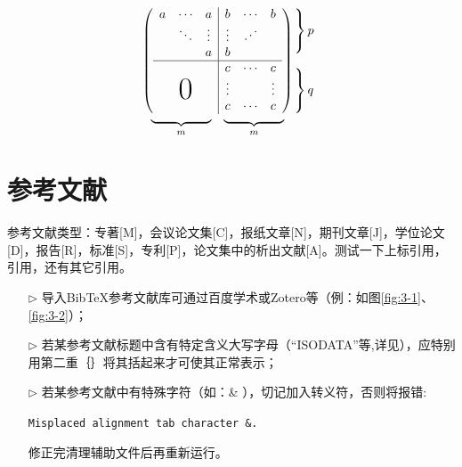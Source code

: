 	\[
	\begin{array}{c@{\hspace{-5pt}}l}
	\left(
	\begin{array}{ccc|ccc}
	a & \cdots & a & b & \cdots & b\\
	& \ddots & \vdots & \vdots & \adots\\
	&        & a & b \\ \hline
	&        &   & c & \cdots & c\\
	&        &   & \vdots & & \vdots\\
	\multicolumn{3}{c|}{\raisebox{2ex}[0pt]{\Huge 0}}
	& c & \cdots & c 
	\end{array}
	\right)
	&
	\begin{array}{l}
	\left.\rule{0mm}{7mm}\right\}p\\
	\\
	\left.\rule{0mm}{7mm}\right\}q
	\end{array}
	\\[-5pt]
	\begin{array}{cc}
	\underbrace{\rule{17mm}{0mm}}_m &
	\underbrace{\rule{17mm}{0mm}}_m
	\end{array}
	& %
	\end{array}
	\]

\section{参考文献}
参考文献类型：专著[M]，会议论文集[C]，报纸文章[N]，期刊文章[J]，学位论文[D]，报告[R]，标准[S]，专利[P]，论文集中的析出文献[A]。测试一下上标引用，引用\cite{Le2016Multiple,Kaya2015,tf2017}，还有其它引用。

\begin{itemize}
	\item[$\triangleright$] 导入BibTeX参考文献库可通过百度学术或Zotero等（例：如图\ref{fig:3-1}、\ref{fig:3-2}）；
	\item[$\triangleright$] 若某参考文献标题中含有特定含义大写字母（“ISODATA”等,详见\cite{Li2017An}），应特别用第二重｛｝将其括起来才可使其正常表示；
	\item[$\triangleright$] 若某参考文献中有特殊字符（如：\& ），切记加入转义符，否则将报错:
	
	\verb|Misplaced alignment tab character &.|

	修正完清理辅助文件后再重新运行。
	
\end{itemize}

